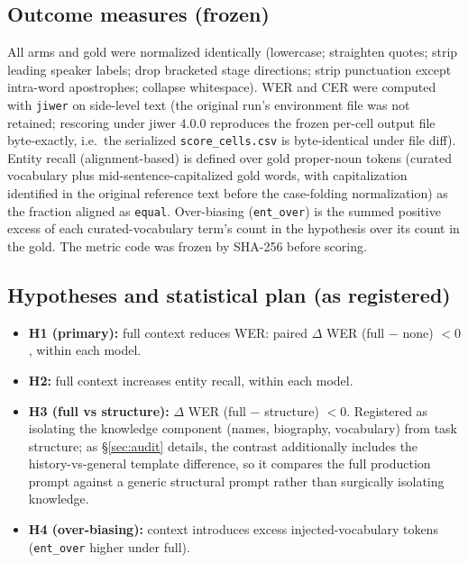 \documentclass[11pt]{article}
\begin{document}
\subsection{Outcome measures (frozen)}

All arms and gold were normalized identically (lowercase; straighten quotes; strip leading speaker labels; drop bracketed stage directions; strip punctuation except intra-word apostrophes; collapse whitespace). WER and CER were computed with \texttt{jiwer} \citep{vaessen25} on side-level text (the original run's environment file was not retained; rescoring under jiwer 4.0.0 reproduces the frozen per-cell output file byte-exactly, i.e.\ the serialized \texttt{score\_cells.csv} is byte-identical under file diff). Entity recall (alignment-based) is defined over gold proper-noun tokens (curated vocabulary plus mid-sentence-capitalized gold words, with capitalization identified in the original reference text before the case-folding normalization) as the fraction aligned as \texttt{equal}. Over-biasing (\texttt{ent\_over}) is the summed positive excess of each curated-vocabulary term's count in the hypothesis over its count in the gold. The metric code was frozen by SHA-256 before scoring.

\subsection{Hypotheses and statistical plan (as registered)}

\begin{itemize}
\item \textbf{H1 (primary):} full context reduces WER: paired $\Delta$ WER (full $-$ none) $< 0$, within each model.
\item \textbf{H2:} full context increases entity recall, within each model.
\item \textbf{H3 (full vs structure):} $\Delta$ WER (full $-$ structure) $< 0$. Registered as isolating the knowledge component (names, biography, vocabulary) from task structure; as \S\ref{sec:audit} details, the contrast additionally includes the history-vs-general template difference, so it compares the full production prompt against a generic structural prompt rather than surgically isolating knowledge.
\item \textbf{H4 (over-biasing):} context introduces excess injected-vocabulary tokens (\texttt{ent\_over} higher under full).
\end{itemize}
\end{document}
